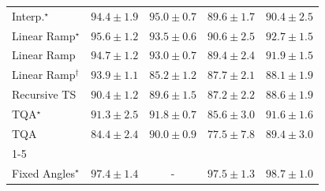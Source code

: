 \begin{tabular}{l|cccc|}
Interp.$^\star$ & {\cellcolor[HTML]{086E3A}} \color[HTML]{F1F1F1} $94.4\pm 1.9$ & {\cellcolor[HTML]{016937}} \color[HTML]{F1F1F1} $95.0\pm 0.7$ & {\cellcolor[HTML]{359C53}} \color[HTML]{F1F1F1} $89.6\pm 1.7$ & {\cellcolor[HTML]{2F934D}} \color[HTML]{F1F1F1} $90.4\pm 2.5$ \\
Linear Ramp$^\star$ & {\cellcolor[HTML]{006435}} \color[HTML]{F1F1F1} $95.6\pm 1.2$ & {\cellcolor[HTML]{11753D}} \color[HTML]{F1F1F1} $93.5\pm 0.6$ & {\cellcolor[HTML]{2D914B}} \color[HTML]{F1F1F1} $90.6\pm 2.5$ & {\cellcolor[HTML]{197C40}} \color[HTML]{F1F1F1} $92.7\pm 1.5$ \\
Linear Ramp & {\cellcolor[HTML]{056C39}} \color[HTML]{F1F1F1} $94.7\pm 1.2$ & {\cellcolor[HTML]{167A3F}} \color[HTML]{F1F1F1} $93.0\pm 0.7$ & {\cellcolor[HTML]{379E54}} \color[HTML]{F1F1F1} $89.4\pm 2.4$ & {\cellcolor[HTML]{218242}} \color[HTML]{F1F1F1} $91.9\pm 1.5$ \\
Linear Ramp$^\dagger$ & {\cellcolor[HTML]{0D733C}} \color[HTML]{F1F1F1} $93.9\pm 1.1$ & {\cellcolor[HTML]{70C275}} \color[HTML]{000000} $85.2\pm 1.2$ & {\cellcolor[HTML]{49AF61}} \color[HTML]{F1F1F1} $87.7\pm 2.1$ & {\cellcolor[HTML]{43AC5E}} \color[HTML]{F1F1F1} $88.1\pm 1.9$ \\
Recursive TS & {\cellcolor[HTML]{2F934D}} \color[HTML]{F1F1F1} $90.4\pm 1.2$ & {\cellcolor[HTML]{359C53}} \color[HTML]{F1F1F1} $89.6\pm 1.5$ & {\cellcolor[HTML]{51B365}} \color[HTML]{F1F1F1} $87.2\pm 2.2$ & {\cellcolor[HTML]{3EA75A}} \color[HTML]{F1F1F1} $88.6\pm 1.9$ \\
TQA$^\star$ & {\cellcolor[HTML]{268846}} \color[HTML]{F1F1F1} $91.3\pm 2.5$ & {\cellcolor[HTML]{228343}} \color[HTML]{F1F1F1} $91.8\pm 0.7$ & {\cellcolor[HTML]{6BC072}} \color[HTML]{000000} $85.6\pm 3.0$ & {\cellcolor[HTML]{248644}} \color[HTML]{F1F1F1} $91.6\pm 1.6$ \\
TQA & {\cellcolor[HTML]{7EC97B}} \color[HTML]{000000} $84.4\pm 2.4$ & {\cellcolor[HTML]{31974F}} \color[HTML]{F1F1F1} $90.0\pm 0.9$ & {\cellcolor[HTML]{DCF1A5}} \color[HTML]{000000} $77.5\pm 7.8$ & {\cellcolor[HTML]{379E54}} \color[HTML]{F1F1F1} $89.4\pm 3.0$ \\
\cline{1-5}
\multicolumn{5}{c}{\rule{0pt}{8pt}SV} \\
\midrule
Fixed Angles$^\star$ & {\cellcolor[HTML]{03446A}} \color[HTML]{F1F1F1} $97.4\pm 1.4$ & {\cellcolor[HTML]{000000}} \color[HTML]{F1F1F1} {\cellcolor{white}} \color{black} - & {\cellcolor[HTML]{03446A}} \color[HTML]{F1F1F1} $97.5\pm 1.3$ & {\cellcolor[HTML]{023858}} \color[HTML]{F1F1F1} $98.7\pm 1.0$ \\

\end{tabular}
